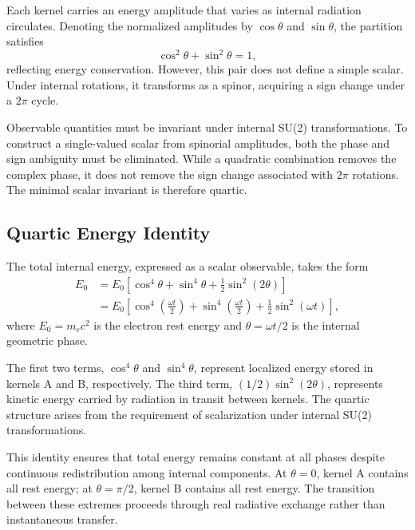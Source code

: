 \documentclass[%
 reprint,
 amsmath,amssymb,
 aps,
 prb,
]{revtex4-2}
\numberwithin{equation}{section}
\begin{document}
Each kernel carries an energy amplitude that varies as internal radiation circulates. Denoting the normalized amplitudes by $\cos\theta$ and $\sin\theta$, the partition satisfies
\begin{equation}
\cos^2\theta + \sin^2\theta = 1,
\label{eq:amplitude_partition}
\end{equation}
reflecting energy conservation. However, this pair does not define a simple scalar. Under internal rotations, it transforms as a spinor, acquiring a sign change under a $2\pi$ cycle.

Observable quantities must be invariant under internal SU(2) transformations. To construct a single-valued scalar from spinorial amplitudes, both the phase and sign ambiguity must be eliminated. While a quadratic combination removes the complex phase, it does not remove the sign change associated with $2\pi$ rotations. The minimal scalar invariant is therefore quartic.


\subsection{Quartic Energy Identity}
\label{subsec:quartic_identity}

The total internal energy, expressed as a scalar observable, takes the form
\begin{equation}
\begin{aligned}
E_0 &= E_0 \left[ \cos^4\theta + \sin^4\theta + \frac{1}{2}\sin^2(2\theta) \right] \\
&= E_0 \left[ \cos^4\left(\frac{\omega t}{2}\right) + \sin^4\left(\frac{\omega t}{2}\right) + \frac{1}{2}\sin^2(\omega t) \right],
\end{aligned}
\label{eq:energy_identity}
\end{equation}
where $E_0 = m_e c^2$ is the electron rest energy and $\theta = \omega t/2$ is the internal geometric phase.

The first two terms, $\cos^4\theta$ and $\sin^4\theta$, represent localized energy stored in kernels A and B, respectively. The third term, $(1/2)\sin^2(2\theta)$, represents kinetic energy carried by radiation in transit between kernels. The quartic structure arises from the requirement of scalarization under internal SU(2) transformations.

This identity ensures that total energy remains constant at all phases despite continuous redistribution among internal components. At $\theta = 0$, kernel A contains all rest energy; at $\theta = \pi/2$, kernel B contains all rest energy. The transition between these extremes proceeds through real radiative exchange rather than instantaneous transfer.
\end{document}
